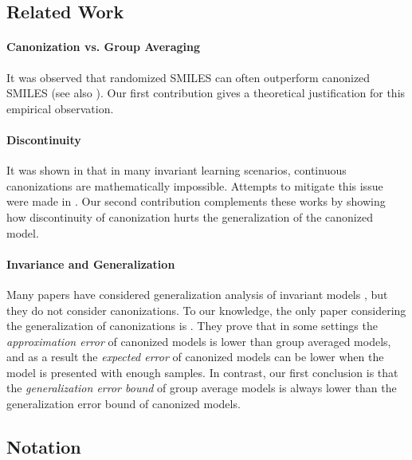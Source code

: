 \subsection{Related Work}
\paragraph{Canonization vs. Group Averaging} It was observed that randomized SMILES can often outperform canonized SMILES \cite{ArusPous2019,Bjerrum2017SMILESEA} (see also \cite{ito2026random}). Our first contribution gives a theoretical justification for this empirical observation.

\paragraph{Discontinuity} It was shown in \cite{dym2024equivariant,pmlr-v235-baker24a} that in many invariant learning scenarios, continuous canonizations are mathematically impossible. Attempts to mitigate this issue were made in  \cite{tahmasebi2025regularity,lin2026adaptive}. Our second contribution complements these works by showing how discontinuity of canonization hurts the generalization of the canonized model.

\paragraph{Invariance and Generalization} Many papers have considered generalization analysis of invariant models \cite{vasileiou2025survey,petrache2023approximationgeneralization,maskey2025generalization, franks2024weisfeiler}, but they do not consider canonizations. To our knowledge, the only paper considering the generalization of canonizations is \cite{tahmasebi2025generalization}. They prove that in some settings the \emph{approximation error} of canonized models is lower than group averaged models, and as a result the \emph{expected error} of canonized models can be lower when the model is presented with enough samples. In contrast, our first conclusion is that the \emph{generalization error bound} of group average models is always lower than the generalization error bound of canonized models.

\subsection{Notation}
